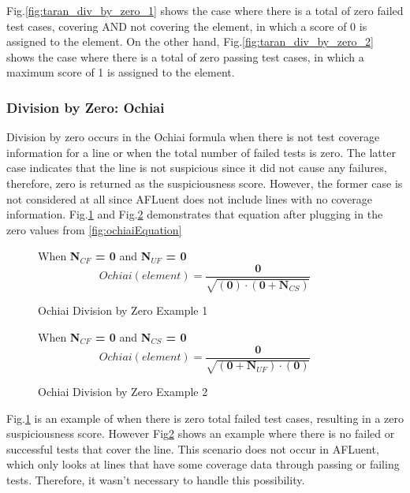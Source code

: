 Fig.\ref{fig:taran_div_by_zero_1} shows the case where there is a total of zero
failed test cases, covering AND not covering the element, in which a score
of 0 is assigned to the element. On the other hand,
Fig.\ref{fig:taran_div_by_zero_2} shows the case where there is a total of zero
passing test cases, in which a maximum score of 1 is assigned to the element.

\subsubsection{Division by Zero: Ochiai}
\label{subsubsec:div_by_zero_ochiai}

Division by zero occurs in the Ochiai formula when there is not test coverage
information for a line or when the total number of failed tests is zero.
The latter case indicates that the line is not suspicious since it did not
cause any failures, therefore, zero is returned as the suspiciousness score.
However, the former case is not considered at all since AFLuent does not include
lines with no coverage information.
Fig.\ref{fig:ochiai_div_by_zero_1} and Fig.\ref{fig:ochiai_div_by_zero_2}
demonstrates that equation after plugging in
the zero values from \ref{fig:ochiaiEquation}

\begin{figure}[!htb]
	\begin{center}
        When \textbf{N$_{CF}$ = 0} and \textbf{N$_{UF}$ = 0 }
		\begin{equation}
			Ochiai(element) = \frac{\textbf{0}}{\sqrt{(\textbf{0}) \cdot (\textbf{0}  + \textbf{N$_{CS}$})}}
		\end{equation}
		\caption{\label{fig:ochiai_div_by_zero_1} Ochiai Division by Zero Example 1}
	\end{center}
\end{figure}

\begin{figure}[!htb]
	\begin{center}
        When \textbf{N$_{CF}$ = 0} and \textbf{N$_{CS}$ = 0 }
		\begin{equation}
			Ochiai(element) = \frac{\textbf{0}}{\sqrt{(\textbf{0}  + \textbf{N$_{UF}$}) \cdot (\textbf{0})}}
		\end{equation}
		\caption{\label{fig:ochiai_div_by_zero_2} Ochiai Division by Zero Example 2}
	\end{center}
\end{figure}

Fig.\ref{fig:ochiai_div_by_zero_1} is an example of when there is zero total
failed test cases, resulting in a zero suspiciousness score.
However Fig\ref{fig:ochiai_div_by_zero_2} shows an example where there is no
failed or successful tests that cover the line. This scenario does not
occur in AFLuent, which only looks at lines that have some coverage data through
passing or failing tests. Therefore, it wasn't necessary to handle this possibility.

